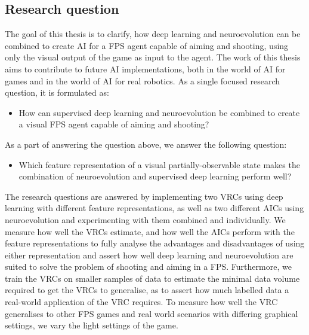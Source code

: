 \subsection{Research question}
\label{sub:research-question}
The goal of this thesis is to clarify, how deep learning and neuroevolution can be combined to create AI for a FPS agent capable of aiming and shooting, using only the visual output of the game as input to the agent. The work of this thesis aims to contribute to future AI implementations, both in the world of AI for games and in the world of AI for real robotics. As a single focused research question, it is formulated as:
\begin{itemize}
\item How can supervised deep learning and neuroevolution be combined to create a visual FPS agent capable of aiming and shooting?
\end{itemize}
{\setlength{\parindent}{0cm}
As a part of answering the question above, we answer the following question:
}
\begin{itemize}
\item Which feature representation of a visual partially-observable state makes the combination of neuroevolution and supervised deep learning perform well?
\end{itemize}
The research questions are answered by implementing two VRCs using deep learning with different feature representations, as well as two different AICs using neuroevolution and experimenting with them combined and individually. We measure how well the VRCs estimate, and how well the AICs perform with the feature representations to fully analyse the advantages and disadvantages of using either representation and assert how well deep learning and neuroevolution are suited to solve the problem of shooting and aiming in a FPS. Furthermore, we train the VRCs on smaller samples of data to estimate the minimal data volume required to get the VRCs to generalise, as to assert how much labelled data a real-world application of the VRC requires. To measure how well the VRC generalises to other FPS games and real world scenarios with differing graphical settings, we vary the light settings of the game.

